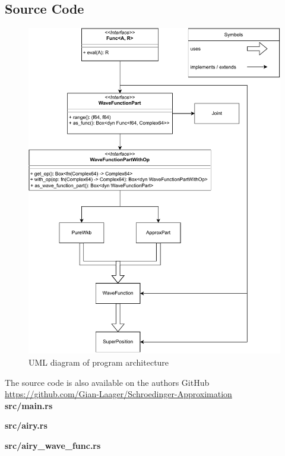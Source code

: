 \documentclass[11pt,DIV=10,final]{scrreprt} %
\begin{document}
{\begin{appendix}
\chapter{Source Code}
\begin{figure}[H]\label{fig:uml-arch}
  \centering
  \includegraphics[width=\textwidth]{program_architecture.pdf}
  \caption{UML diagram of program architecture}
\end{figure}

The source code is also available on the authors GitHub \\
\url{https://github.com/Gian-Laager/Schroedinger-Approximation}\\[3ex]

{\noindent \large \bfseries src/main.rs}


\vspace*{3ex}
{\noindent \large \bfseries src/airy.rs}


\vspace*{3ex}
{\noindent \large \bfseries src/airy\_wave\_func.rs}



\end{appendix}}
\end{document}
